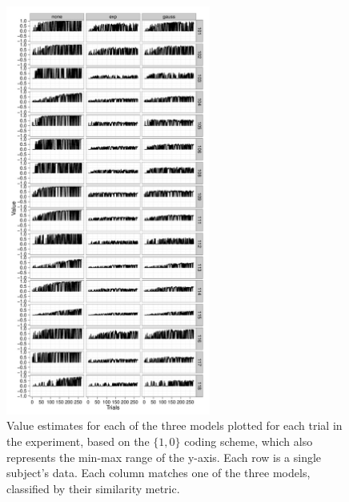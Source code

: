 \begin{figure}[tp]
    \includegraphics[width=0.6\textwidth]{f_value_acc}
    \centering    
    \caption{Value estimates for each of the three models plotted for each trial in the experiment, based on the $\{1,0\}$ coding scheme, which also represents the min-max range of the y-axis.  Each row is a single subject's data.  Each column matches one of the three models, classified by their similarity metric.}
    \label{fig:valueacc}
\end{figure}
